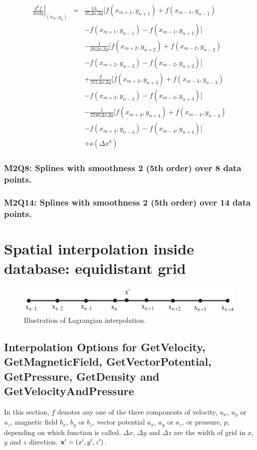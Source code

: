 \documentclass[11pt]{article}
\def\bea{\begin{eqnarray}}
\def\eea{\end{eqnarray}}
\begin{document}
\bea \left.\frac{d^2f}{dxdy}\right|_{(x_m,y_n)} &=&
\frac{14}{35\Delta
x\Delta y}[f(x_{m+1},y_{n+1})+f(x_{m-1},y_{n-1})\nonumber\\
&&-f(x_{m+1},y_{n-1})-f(x_{m-1},y_{n+1})]\nonumber\\
&&-\frac{1}{20\Delta
x\Delta y}[f(x_{m+2},y_{n+2})+f(x_{m-2},y_{n-2})\nonumber\\
&&-f(x_{m+2},y_{n-2})-f(x_{m-2},y_{n+2})]\nonumber\\
&&+\frac{2}{315\Delta
x\Delta y}[f(x_{m+3},y_{n+3})+f(x_{m-3},y_{n-3})\nonumber\\
&&-f(x_{m+3},y_{n-3})-f(x_{m-3},y_{n+3})]\nonumber\\
&&-\frac{1}{2240\Delta
x\Delta y}[f(x_{m+4},y_{n+4})+f(x_{m-4},y_{n-4})\nonumber\\
&&-f(x_{m+4},y_{n-4})-f(x_{m-4},y_{n+4})]\nonumber\\
&&+o(\Delta x^8) \eea

\subsubsection*{M2Q8: Splines with smoothness 2 (5th order) over 8 data points.}
\subsubsection*{M2Q14: Splines with smoothness 2 (5th order) over 14 data points.}

\section{Spatial interpolation inside database: equidistant grid}
\label{sec:spa}
\begin{figure}[h]
\begin{minipage}{\linewidth}
\centering\includegraphics[width=1.0\linewidth]{Lagrangian.eps}
\end{minipage} \caption{Illustration of Lagrangian interpolation. }\label{Lagrangian}
\end{figure}
\subsection{Interpolation Options for GetVelocity, GetMagneticField, GetVectorPotential, GetPressure, GetDensity and GetVelocityAndPressure}
In this section, $f$ denotes any one of the three components of
velocity, $u_x$, $u_y$ or $u_z$, magnetic field $b_x$, $b_y$ or $b_z$, vector potential $a_x$, $a_y$ or $a_z$, or pressure, $p$,  depending on which
function is called. $\Delta x$, $\Delta y$ and $\Delta z$ are the
width of grid in $x$, $y$ and $z$ direction. ${\bf x'}=(x',y',z')$.
\end{document}
